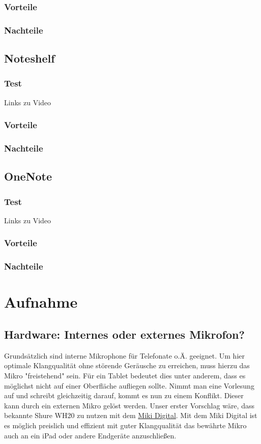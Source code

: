 \documentclass[parskip=off,index=totocnumbered]{scrreprt}
\begin{document}
\subsection{Vorteile}
\subsection{Nachteile}

\section{Noteshelf}
\subsection{Test}
Links zu Video
\subsection{Vorteile}
\subsection{Nachteile}

\section{OneNote}
\subsection{Test}
Links zu Video
\subsection{Vorteile}
\subsection{Nachteile}

\chapter{Aufnahme}
\section{Hardware: Internes oder externes Mikrofon?}

Grundsätzlich sind interne Mikrophone für Telefonate o.Ä. geeignet. Um hier optimale Klangqualität ohne störende Geräusche zu erreichen, muss hierzu das Mikro "freistehend" sein. Für ein Tablet bedeutet dies unter anderem, dass es möglichst nicht auf einer Oberfläche aufliegen sollte. Nimmt man eine Vorlesung auf und schreibt gleichzeitig darauf, kommt es nun zu einem Konflikt. Dieser kann durch ein externen Mikro gelöst werden.
Unser erster Vorschlag wäre, dass bekannte Shure WH20 zu nutzen mit dem \href{http://miki-cable.com/miki-digital/}{Miki Digital}. Mit dem Miki Digital ist es möglich preislich und effizient mit guter Klangqualität das bewährte Mikro auch an ein iPad oder andere Endgeräte anzuschließen. 
\end{document}
